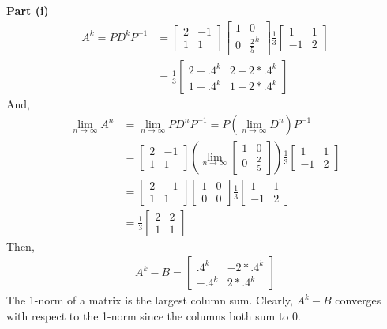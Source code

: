 \documentclass[letterpaper,12pt]{article}
\theoremstyle{definition}
\begin{document}
\noindent\textbf{Part (i)}
\begin{align*}
A^k = P D^k P^{-1} &= \begin{bmatrix} 2 & -1 \\ 1 & 1 \end{bmatrix} 
  	  \begin{bmatrix} 1 & 0 \\ 0 & \frac{2}{5}^k  \end{bmatrix}
	  \frac{1}{3} \begin{bmatrix} 1 & 1 \\ -1 & 2 \end{bmatrix} \\
	  &= \frac{1}{3}  
	  \begin{bmatrix}
	  2 + .4^k  & 2 - 2 * .4^k \\
	  1 - .4^k & 1 + 2 * .4^k
	  \end{bmatrix}
\end{align*}
And,
\begin{align*}
	\lim_{n\to\infty} A^n &= \lim_{n\to\infty} P D^n P^{-1} = P  \left(\lim_{n\to\infty} D^n \right) P^{-1} \\
&=  \begin{bmatrix} 2 & -1 \\ 1 & 1 \end{bmatrix} 
  	  \left(\lim_{n\to\infty}\begin{bmatrix} 1 & 0 \\ 0 & \frac{2}{5}  \end{bmatrix}\right) 
	  \frac{1}{3} \begin{bmatrix} 1 & 1 \\ -1 & 2 \end{bmatrix} \\
	  &= \begin{bmatrix} 2 & -1 \\ 1 & 1 \end{bmatrix} 
	  \begin{bmatrix} 1 & 0 \\ 0 & 0 \end{bmatrix}
	  \frac{1}{3} \begin{bmatrix} 1 & 1 \\ -1 & 2 \end{bmatrix} \\
	  &= \frac{1}{3}
	  \begin{bmatrix}
	  2 & 2 \\
	  1 & 1
	  \end{bmatrix}
\end{align*}
Then,
\begin{align*}
	A^k - B = 
	\begin{bmatrix}
	.4^k & -2 * .4^k \\
	-.4^k & 2 * .4^k
	\end{bmatrix}
\end{align*}
The 1-norm of a matrix is the largest column sum. Clearly, $A^k - B$ converges with respect to the 1-norm since the columns both sum to 0. 
\end{document}

